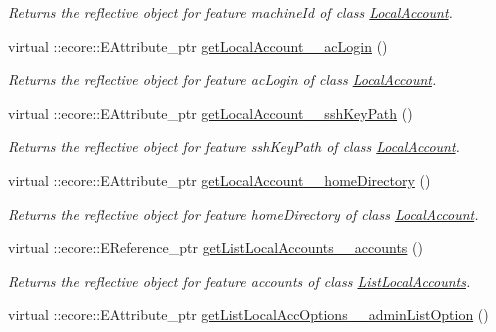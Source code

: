 \begin{DoxyCompactItemize}
\begin{DoxyCompactList}\small\item\em Returns the reflective object for feature machineId of class \hyperlink{classUMS__Data_1_1LocalAccount}{LocalAccount}. \item\end{DoxyCompactList}\item 
virtual ::ecore::EAttribute\_\-ptr \hyperlink{classUMS__Data_1_1UMS__DataPackage_a69275a7c9ec58cf9245478d807eb923a}{getLocalAccount\_\-\_\-acLogin} ()
\begin{DoxyCompactList}\small\item\em Returns the reflective object for feature acLogin of class \hyperlink{classUMS__Data_1_1LocalAccount}{LocalAccount}. \item\end{DoxyCompactList}\item 
virtual ::ecore::EAttribute\_\-ptr \hyperlink{classUMS__Data_1_1UMS__DataPackage_a8ae75583e9c4b81370ebeaf279826f46}{getLocalAccount\_\-\_\-sshKeyPath} ()
\begin{DoxyCompactList}\small\item\em Returns the reflective object for feature sshKeyPath of class \hyperlink{classUMS__Data_1_1LocalAccount}{LocalAccount}. \item\end{DoxyCompactList}\item 
virtual ::ecore::EAttribute\_\-ptr \hyperlink{classUMS__Data_1_1UMS__DataPackage_a0e3017d46386385481f2a8b61ddedd05}{getLocalAccount\_\-\_\-homeDirectory} ()
\begin{DoxyCompactList}\small\item\em Returns the reflective object for feature homeDirectory of class \hyperlink{classUMS__Data_1_1LocalAccount}{LocalAccount}. \item\end{DoxyCompactList}\item 
virtual ::ecore::EReference\_\-ptr \hyperlink{classUMS__Data_1_1UMS__DataPackage_aaafe6c0797e305aa2f19b77d8ff8c403}{getListLocalAccounts\_\-\_\-accounts} ()
\begin{DoxyCompactList}\small\item\em Returns the reflective object for feature accounts of class \hyperlink{classUMS__Data_1_1ListLocalAccounts}{ListLocalAccounts}. \item\end{DoxyCompactList}\item 
virtual ::ecore::EAttribute\_\-ptr \hyperlink{classUMS__Data_1_1UMS__DataPackage_a21246202443e2acc43ee19f663c4c1a7}{getListLocalAccOptions\_\-\_\-adminListOption} ()

\end{DoxyCompactItemize}
